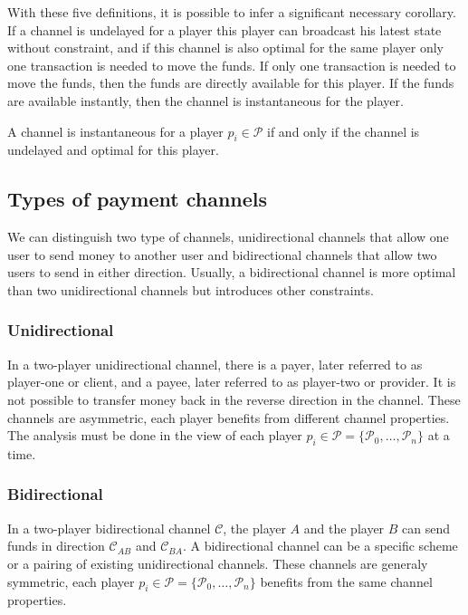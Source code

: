 \documentclass{llncs}
\begin{document}
With these five definitions, it is possible to infer a significant necessary corollary. If a channel is undelayed for a player this player can broadcast his latest state without constraint, and if this channel is also optimal for the same player only one transaction is needed to move the funds. If only one transaction is needed to move the funds, then the funds are directly available for this player. If the funds are available instantly, then the channel is instantaneous for the player.

\begin{corollary}[Instantaneous] A channel is instantaneous for a player $p_i \in \mathcal{P}$ if and only if the channel is undelayed and optimal for this player.
\end{corollary}

\subsection{Types of payment channels}

We can distinguish two type of channels, unidirectional channels that allow one user to send money to another user and bidirectional channels that allow two users to send in either direction. Usually, a bidirectional channel is more optimal than two unidirectional channels but introduces other constraints.

\subsubsection{Unidirectional}

In a two-player unidirectional channel, there is a payer, later referred to as player-one or client, and a payee, later referred to as player-two or provider.  It is not possible to transfer money back in the reverse direction in the channel. These channels are asymmetric, each player benefits from different channel properties. The analysis must be done in the view of each player $p_i \in \mathcal{P} = \{\mathcal{P}_0, \dots, \mathcal{P}_n\}$ at a time.

\subsubsection{Bidirectional}

In a two-player bidirectional channel $\mathcal{C}$, the player $A$ and the player $B$ can send funds in direction $\mathcal{C}_{AB}$ and $\mathcal{C}_{BA}$. A bidirectional channel can be a specific scheme or a pairing of existing unidirectional channels. These channels are generaly symmetric, each player $p_i \in \mathcal{P} = \{\mathcal{P}_0, \dots, \mathcal{P}_n\}$ benefits from the same channel properties.
\end{document}
